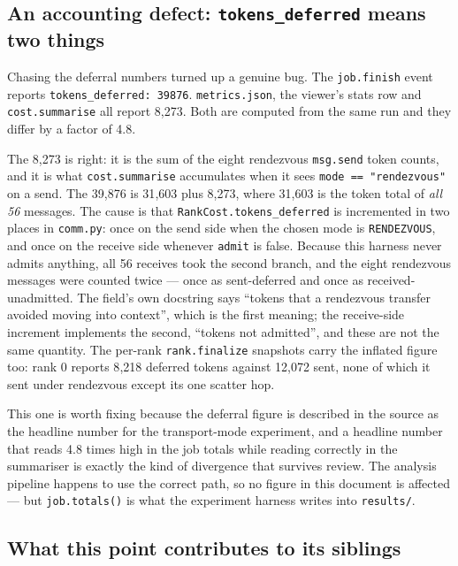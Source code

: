 \documentclass[11pt]{article}
\begin{document}
\subsection*{An accounting defect: \texttt{tokens\_deferred} means two things}

Chasing the deferral numbers turned up a genuine bug. The \texttt{job.finish} event reports
\texttt{tokens\_deferred: 39876}. \texttt{metrics.json}, the viewer's stats row and
\texttt{cost.summarise} all report 8{,}273. Both are computed from the same run and they
differ by a factor of 4.8.

The 8{,}273 is right: it is the sum of the eight rendezvous \texttt{msg.send} token counts,
and it is what \texttt{cost.summarise} accumulates when it sees
\texttt{mode == "rendezvous"} on a send. The 39{,}876 is 31{,}603 plus 8{,}273, where 31{,}603
is the token total of \emph{all 56} messages. The cause is that
\texttt{RankCost.tokens\_deferred} is incremented in two places in \texttt{comm.py}: once on
the send side when the chosen mode is \texttt{RENDEZVOUS}, and once on the receive side
whenever \texttt{admit} is false. Because this harness never admits anything, all 56
receives took the second branch, and the eight rendezvous messages were counted twice ---
once as sent-deferred and once as received-unadmitted. The field's own docstring says
``tokens that a rendezvous transfer avoided moving into context'', which is the first
meaning; the receive-side increment implements the second, ``tokens not admitted'', and
these are not the same quantity. The per-rank \texttt{rank.finalize} snapshots carry the
inflated figure too: rank 0 reports 8{,}218 deferred tokens against 12{,}072 sent, none of
which it sent under rendezvous except its one scatter hop.

This one is worth fixing because the deferral figure is described in the source as the
headline number for the transport-mode experiment, and a headline number that reads 4.8
times high in the job totals while reading correctly in the summariser is exactly the kind
of divergence that survives review. The analysis pipeline happens to use the correct path,
so no figure in this document is affected --- but \texttt{job.totals()} is what the
experiment harness writes into \texttt{results/}.

\subsection*{What this point contributes to its siblings}
\end{document}
